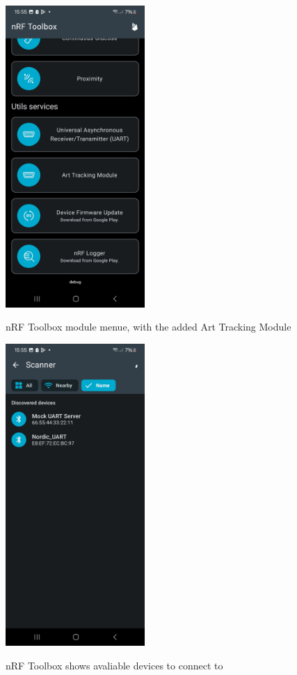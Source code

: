 \begin{figure}[ht!]
\centering
 \caption{nRF Toolbox module menue, with the added Art Tracking Module}
\includegraphics[width=200px]{graphics/nRF_toolbox_modules.jpg}
\label{f:Toolbox_modules}
\end{figure}

\begin{figure}[ht!]
\centering
 \caption{nRF Toolbox shows avaliable devices to connect to}
\includegraphics[width=200px]{graphics/nRF_toolbox_connect.jpg}
\label{f:Toolbox_connect}
\end{figure}

